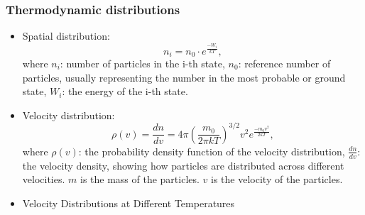 \documentclass[t,aspectratio=169]{beamer}
\begin{document}


\begin{frame}
\frametitle{Thermodynamic distributions}

\begin{itemize}
\setlength{\parskip}{0pt}
\setlength{\itemsep}{4pt}

\item Spatial distribution: $$n_i = n_0 \cdot e^{\frac{-W_i}{kT}},$$ where $n_i$: number of particles in the i-th state, $n_0$: reference number of particles, usually representing the number in the most probable or ground state, $W_i$: the energy of the i-th state.

\item Velocity distribution: 
$$\rho(v) = \frac{dn}{dv} = 4\pi \left( \frac{m_0}{2\pi kT} \right)^{3/2} v^2 e^{\frac{-m_0 v^2}{2kT}},$$
where $\rho(v)$: the probability density function of the velocity distribution, $\frac{dn}{dv}$: the velocity density, showing how particles are distributed across different velocities. $m$ is the mass of the particles. $v$ is the velocity of the particles.


\framebreak
\item Velocity Distributions at Different Temperatures
\smallskip
\begin{center}
\end{center}
\end{itemize}
\end{frame}
\end{document}
